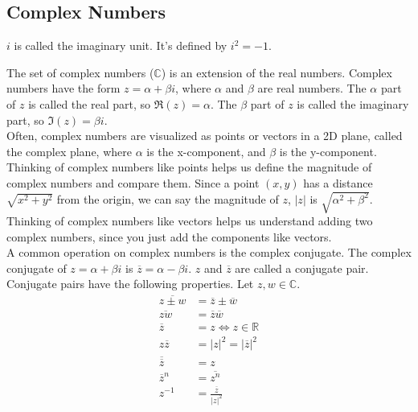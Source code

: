 \subsection{Complex Numbers}
\begin{definition}
	$i$ is called the imaginary unit. It's defined by $i^2 = -1$.
\end{definition}


\noindent
The set of complex numbers ($\mathbb{C}$) is an extension of the real numbers. Complex numbers have the form $z = \alpha + \beta i$, where $\alpha$ and $\beta$ are real numbers. The $\alpha$ part of $z$ is called the real part, so $\Re(z) = \alpha$. The $\beta$ part of $z$ is called the imaginary part, so $\Im(z) = \beta i$.\\

\noindent
Often, complex numbers are visualized as points or vectors in a 2D plane, called the complex plane, where $\alpha$ is the x-component, and $\beta$ is the y-component. Thinking of complex numbers like points helps us define the magnitude of complex numbers and compare them. Since a point $(x,y)$ has a distance $\sqrt{x^2+y^2}$ from the origin, we can say the magnitude of $z$, $\lvert z \rvert$ is $\sqrt{\alpha^2 + \beta^2}$. Thinking of complex numbers like vectors helps us understand adding two complex numbers, since you just add the components like vectors.\\

\noindent
A common operation on complex numbers is the complex conjugate. The complex conjugate of $z = \alpha + \beta i$ is $\overline{z} = \alpha - \beta i$. $z$ and $\overline{z}$ are called a conjugate pair.\\

\noindent
Conjugate pairs have the following properties.
Let $z, w \in \mathbb{C}$.
\begin{align*}
	\overline{z \pm w} &= \overline{z} \pm \overline{w} \\
	\overline{zw} &= \overline{z}\overline{w} \\
	\overline{z} &= z \Leftrightarrow z \in \mathbb{R} \\
	z\overline{z} &= \lvert z \rvert^2 = \lvert \overline{z} \rvert^2 \\
	\overline{\overline{z}} &= z \\
	\overline{z}^n &= \overline{z^n} \\
	z^{-1} &= \frac{\overline{z}}{\lvert z \rvert^2} 
\end{align*}
